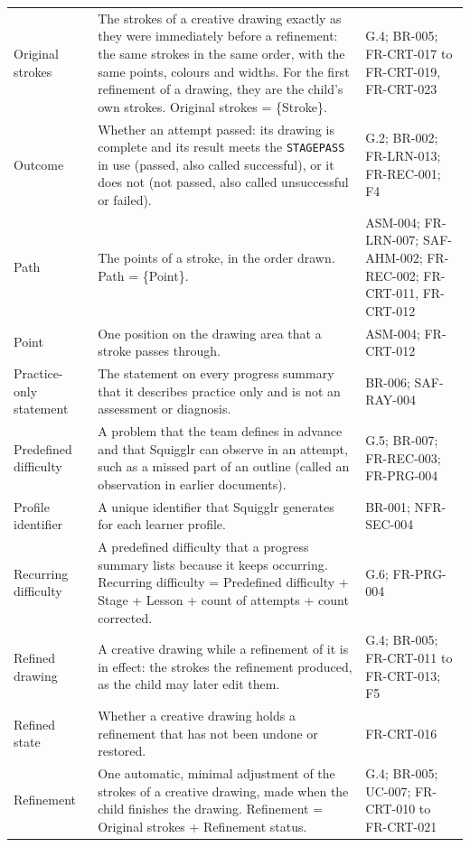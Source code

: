 \documentclass[12pt]{article}
\renewcommand{\_}{\textunderscore\allowbreak}%
\begin{document}
{\begin{longtable}{@{}
  >{\raggedright\arraybackslash}p{}
  >{\raggedright\arraybackslash}p{}
  >{\raggedright\arraybackslash\exhyphenpenalty=10000}p{}@{}}
Original strokes & The strokes of a creative drawing exactly as they were
immediately before a refinement: the same strokes in the same order, with the
same points, colours and widths. For the first refinement of a drawing, they are
the child's own strokes. Original strokes = \{Stroke\}. & G.4;
BR-005; FR-CRT-017 to FR-CRT-019, FR-CRT-023 \\
\addlinespace
Outcome & Whether an attempt passed: its drawing is complete and its result
meets the \texttt{STAGE\_PASS} in use (passed, also called successful), or it
does not (not passed, also called unsuccessful or failed). & G.2; BR-002; FR-LRN-013;
FR-REC-001; F4 \\
\addlinespace
Path & The points of a stroke, in the order drawn. Path = \{Point\}. & ASM-004; FR-LRN-007; SAF-AHM-002; FR-REC-002;
FR-CRT-011, FR-CRT-012 \\
\addlinespace
Point & One position on the drawing area that a stroke passes through. & ASM-004; FR-CRT-012 \\
\addlinespace
Practice-only statement & The statement on every progress summary that it
describes practice only and is not an assessment or diagnosis. & BR-006; SAF-RAY-004 \\
\addlinespace
Predefined difficulty & A problem that the team defines in advance and that
Squigglr can observe in an attempt, such as a missed part of an outline (called
an observation in earlier documents). & G.5; BR-007;
FR-REC-003; FR-PRG-004 \\
\addlinespace
Profile identifier & A unique identifier that Squigglr generates for each
learner profile. & BR-001; NFR-SEC-004 \\
\addlinespace
Recurring difficulty & A predefined difficulty that a progress summary lists
because it keeps occurring. Recurring difficulty = Predefined difficulty + Stage
+ Lesson + count of attempts + count corrected. & G.6; FR-PRG-004 \\
\addlinespace
Refined drawing & A creative drawing while a refinement of it is in effect: the
strokes the refinement produced, as the child may later edit them. & G.4; BR-005; FR-CRT-011 to FR-CRT-013; F5 \\
\addlinespace
Refined state & Whether a creative drawing holds a refinement that has not been
undone or restored. & FR-CRT-016 \\
\addlinespace
Refinement & One automatic, minimal adjustment of the strokes of a creative
drawing, made when the child finishes the drawing. Refinement = Original strokes
+ Refinement status. & G.4; BR-005; UC-007; FR-CRT-010 to FR-CRT-021 \\

\end{longtable}}
\end{document}
